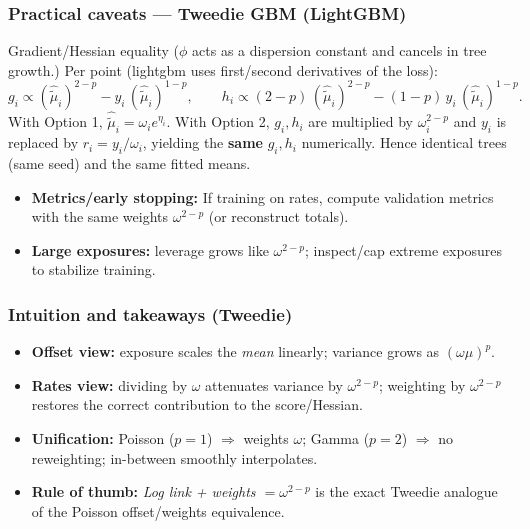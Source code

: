 \documentclass[10pt,aspectratio=169,xcolor={dvipsnames},usepdftitle=false]{beamer}
\begin{document}
\begin{frame}
\frametitle{Practical caveats — Tweedie GBM (LightGBM)}

\begin{block}{Gradient/Hessian equality ($\phi$ acts as a dispersion constant and cancels in tree growth.)}
Per point (lightgbm uses first/second derivatives of the loss):
\[
g_i \propto (\hat{\tilde{\mu}}_i)^{2-p} - y_i\,(\hat{\tilde{\mu}}_i)^{1-p}, \qquad
h_i \propto (2-p)\,(\hat{\tilde{\mu}}_i)^{2-p} - (1-p)\,y_i\,(\hat{\tilde{\mu}}_i)^{1-p}.
\]
With Option 1, $\hat{\tilde{\mu}}_i=\omega_i e^{\eta_i}$.
With Option 2, $g_i,h_i$ are multiplied by $\omega_i^{2-p}$ and $y_i$ is replaced by $r_i=y_i/\omega_i$, yielding the \textbf{same} $g_i,h_i$ numerically. Hence identical trees (same seed) and the same fitted means.
\end{block}

\begin{itemize}
\item \textbf{Metrics/early stopping:} If training on rates, compute validation metrics with the same weights $\omega^{2-p}$ (or reconstruct totals).
\item \textbf{Large exposures:} leverage grows like $\omega^{2-p}$; inspect/cap extreme exposures to stabilize training.
\end{itemize}
\end{frame}

\begin{frame}
\frametitle{Intuition and takeaways (Tweedie)}
\small
\begin{itemize}
\item \textbf{Offset view:} exposure scales the \emph{mean} linearly; variance grows as $(\omega\mu)^p$.
\item \textbf{Rates view:} dividing by $\omega$ attenuates variance by $\omega^{2-p}$; weighting by $\omega^{2-p}$ restores the correct contribution to the score/Hessian.
\item \textbf{Unification:} Poisson ($p{=}1$) $\Rightarrow$ weights $\omega$; Gamma ($p{=}2$) $\Rightarrow$ no reweighting; in-between smoothly interpolates.
\item \textbf{Rule of thumb:} \emph{Log link + weights $=\omega^{2-p}$} is the exact Tweedie analogue of the Poisson offset/weights equivalence.
\end{itemize}
\end{frame}

\begin{frame}
\end{frame}
\end{document}

